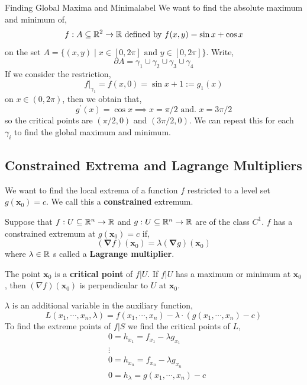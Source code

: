 \begin{ex}{Finding Global Maxima and Minima}{label}
  We want to find the absolute maximum and minimum of,
    \[f: A \subseteq \mathbb{R}^2 \rightarrow \mathbb{R} \text{ defined by } f(x,y) = \sin x + \cos x\]
    on the set $A = \{(x,y) \mid x \in [0,2\pi] \text{ and } y \in [0,2\pi]\}$. Write,
    \[\partial A = \gamma_1 \cup \gamma_2 \cup \gamma_3 \cup \gamma_4\]
    If we consider the restriction,
    \[\left. f\right|_{\gamma_1} = f(x,0) = \sin x + 1 := g_1(x)\]
    on $x \in (0,2\pi)$, then we obtain that,
    \[g^{\prime}(x)=\cos x \implies x=\pi / 2 \text{ and. }x = 3 \pi / 2\]
    so the critical points are $(\pi / 2,0)$ and $(3 \pi / 2, 0)$. We can repeat this for each $\gamma_i$ to find the global maximum and minimum.
\end{ex}

\subsection{Constrained Extrema and Lagrange Multipliers}
We want to find the local extrema of a function $f$ restricted to a level set $g(\mathbf{x}_0) = c$. We call this a \textbf{constrained} extremum. 
\begin{thm}
    Suppose that $f: U \subseteq \mathbb{R}^n \rightarrow \mathbb{R}$ and $g: U \subseteq \mathbb{R}^n \rightarrow \mathbb{R}$ are of the class $C^1$. $f$ has a constrained extremum at $g(\mathbf{x}_0) = c$ if,
     \[(\mathbf{\nabla} f) (\mathbf{x}_0) = \lambda (\mathbf{\nabla} g)(\mathbf{x}_0)\]
     where $\lambda \in \mathbb{R}$ s called a \textbf{Lagrange multiplier}.
\end{thm}

\begin{rmk}
    The point $\mathbf{x}_0$ is a \textbf{critical point} of $f|U$. If $f|U$ has a maximum or minimum at $\mathbf{x}_0$, then $(\nabla f)(\mathbf{x}_0)$ is perpendicular to $U$ at $\mathbf{x}_0$.
\end{rmk}

\begin{rmk}
    $\lambda$ is an additional variable in the auxiliary function,
    \[L(x_1, \cdots, x_n, \lambda) = f(x_1, \cdots, x_n) - \lambda \cdot (g(x_1, \cdots, x_n) - c)\]
    To find the extreme points of $f | S$ we find the critical points of $L$,
    \begin{align*}
        &0 = h_{x_1} = f_{x_1} - \lambda g_{x_1} \\
        &\vdots \\
        &0 = h_{x_n} = f_{x_n} - \lambda g_{x_n} \\
        &0 = h_{\lambda} = g(x_1, \cdots, x_n) - c
    \end{align*}
\end{rmk}

